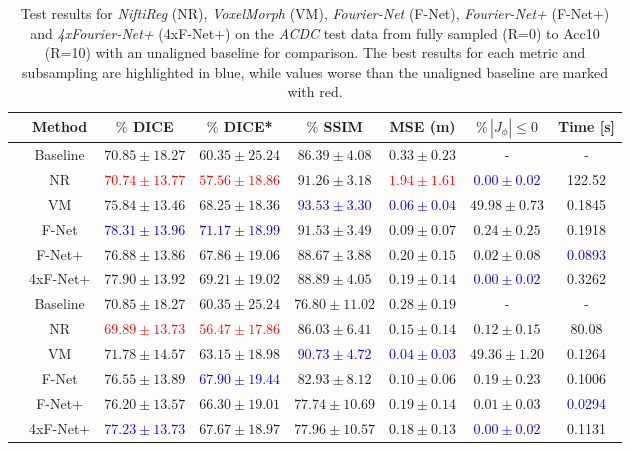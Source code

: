 \documentclass[english,version-2022-01]{uzl-thesis} %
\begin{document}
\begin{table}[h] %
	\scriptsize
	\centering
	\caption{Test results for \emph{NiftiReg} (NR), \emph{VoxelMorph} (VM), \emph{Fourier-Net} (F-Net), \emph{Fourier-Net+} (F-Net+) and \emph{4xFourier-Net+} (4xF-Net+) on the \emph{ACDC} test data from fully sampled (R=0) to Acc10 (R=10) with an unaligned baseline for comparison. The best results for each metric and subsampling are highlighted in blue, while values worse than the unaligned baseline are marked with red.}
	\label{tab:ComparisonSubsamplingACDC}
	\begin{tabular}{c c c c c c c c} 
		\toprule
		 & Method & $\%$ DICE & $\%$ DICE* & $\%$ SSIM & MSE (m) & $\% \, |J_{\phi}|\leq0$ & Time [s] \\
		\midrule
		\multirow{6}{*}{\rotatebox{90}{R=0}} & Baseline & $70.85 \pm 18.27$  & $60.35 \pm 25.24$ & $86.39 \pm 4.08$ & $0.33 \pm 0.23$ & - & -\\  
		 & NR & \textcolor{red}{$70.74 \pm 13.77$} & \textcolor{red}{$57.56 \pm 18.86$} & $91.26 \pm 3.18$ & \textcolor{red}{$1.94 \pm 1.61$} & \textcolor{blue}{$0.00 \pm 0.02$} & 122.52\\
		 & VM & $75.84 \pm 13.46$ & $68.25 \pm 18.36$ & \textcolor{blue}{$93.53 \pm 3.30$} & \textcolor{blue}{$0.06 \pm 0.04$} & $49.98 \pm 0.73$ & 0.1845\\ 
		 & F-Net & \textcolor{blue}{$78.31 \pm 13.96$} & \textcolor{blue}{$71.17 \pm 18.99$} & $91.53 \pm 3.49$ & $0.09 \pm 0.07$ & $0.24 \pm 0.25$ & 0.1918\\ 
		 & F-Net+ & $76.88 \pm 13.86$ & $67.86 \pm 19.06$ & $88.67 \pm 3.88$ & $0.20 \pm 0.15$ & $0.02 \pm 0.08$ & \textcolor{blue}{0.0893} \\ 
		 & 4xF-Net+ & $77.90 \pm 13.92$ & $69.21 \pm 19.02$  & $88.89 \pm 4.05$ & $0.19 \pm 0.14$ & \textcolor{blue}{$0.00 \pm 0.02$} & 0.3262\\ 
		 	
		\midrule
		\multirow{6}{*}{\rotatebox{90}{R=4}} & Baseline & $70.85 \pm 18.27$ & $60.35 \pm 25.24$ & $76.80 \pm 11.02$ & $0.28 \pm 0.19$ & - & -\\  
		 & NR & \textcolor{red}{$69.89 \pm 13.73$} & \textcolor{red}{$56.47 \pm 17.86$} & $86.03 \pm 6.41$ & $0.15 \pm 0.14$ & $ 0.12 \pm 0.15$ & 80.08 \\  
		 & VM & $71.78 \pm 14.57$ & $63.15 \pm 18.98$ & \textcolor{blue}{$90.73 \pm 4.72$} & \textcolor{blue}{$0.04 \pm 0.03$} & $49.36 \pm 1.20$ & 0.1264\\  	
		 & F-Net & $76.55 \pm 13.89$ & \textcolor{blue}{$67.90 \pm 19.44$} & $82.93 \pm 8.12$ & $0.10 \pm 0.06$ & $0.19 \pm 0.23$ & 0.1006\\ 
		 & F-Net+ & $76.20 \pm 13.57$ & $66.30 \pm 19.01$ & $77.74 \pm 10.69$ & $0.19 \pm 0.14$ & $0.01 \pm 0.03$ & \textcolor{blue}{0.0294}\\ 
		 & 4xF-Net+ & \textcolor{blue}{$77.23 \pm 13.73$} & $67.67 \pm 18.97$ & $77.96 \pm 10.57$ & $0.18 \pm 0.13$ & \textcolor{blue}{$0.00 \pm 0.02$} & 0.1131\\ 
		  

\end{tabular}
\end{table}
\end{document}

